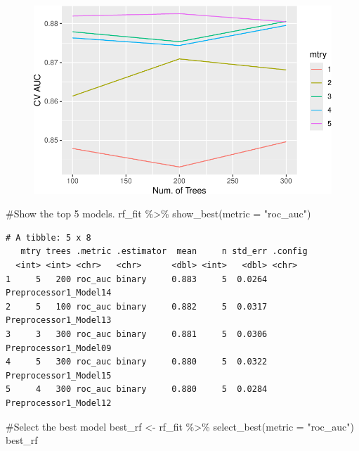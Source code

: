 \documentclass[
]{article}
\newenvironment{Shaded}{\begin{snugshade}}{\end{snugshade}}
\newcommand{\AttributeTok}[1]{\textcolor[rgb]{0.40,0.45,0.13}{#1}}
\newcommand{\CommentTok}[1]{\textcolor[rgb]{0.37,0.37,0.37}{#1}}
\newcommand{\FunctionTok}[1]{\textcolor[rgb]{0.28,0.35,0.67}{#1}}
\newcommand{\NormalTok}[1]{\textcolor[rgb]{0.00,0.23,0.31}{#1}}
\newcommand{\OtherTok}[1]{\textcolor[rgb]{0.00,0.23,0.31}{#1}}
\newcommand{\SpecialCharTok}[1]{\textcolor[rgb]{0.37,0.37,0.37}{#1}}
\newcommand{\StringTok}[1]{\textcolor[rgb]{0.13,0.47,0.30}{#1}}
\begin{document}
\begin{figure}[H]

{\centering \includegraphics{hw4_files/figure-pdf/unnamed-chunk-34-1.pdf}

}

\end{figure}

\begin{Shaded}
\begin{Highlighting}[]
\CommentTok{\#Show the top 5 models.}
\NormalTok{rf\_fit }\SpecialCharTok{\%\textgreater{}\%}
  \FunctionTok{show\_best}\NormalTok{(}\AttributeTok{metric =} \StringTok{"roc\_auc"}\NormalTok{)}
\end{Highlighting}
\end{Shaded}

\begin{verbatim}
# A tibble: 5 x 8
   mtry trees .metric .estimator  mean     n std_err .config              
  <int> <int> <chr>   <chr>      <dbl> <int>   <dbl> <chr>                
1     5   200 roc_auc binary     0.883     5  0.0264 Preprocessor1_Model14
2     5   100 roc_auc binary     0.882     5  0.0317 Preprocessor1_Model13
3     3   300 roc_auc binary     0.881     5  0.0306 Preprocessor1_Model09
4     5   300 roc_auc binary     0.880     5  0.0322 Preprocessor1_Model15
5     4   300 roc_auc binary     0.880     5  0.0284 Preprocessor1_Model12
\end{verbatim}

\begin{Shaded}
\begin{Highlighting}[]
\CommentTok{\#Select the best model}
\NormalTok{best\_rf }\OtherTok{\textless{}{-}}\NormalTok{ rf\_fit }\SpecialCharTok{\%\textgreater{}\%}
  \FunctionTok{select\_best}\NormalTok{(}\AttributeTok{metric =} \StringTok{"roc\_auc"}\NormalTok{)}
\NormalTok{best\_rf}
\end{Highlighting}
\end{Shaded}
\end{document}
